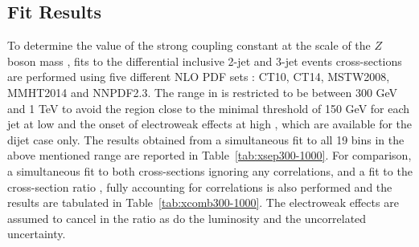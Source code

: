 \subsection{Fit Results}
To determine the value of the strong coupling constant at the scale of the $Z$ boson mass \alpsmz, fits to the differential inclusive 2-jet and 3-jet events cross-sections are performed using five different NLO PDF sets : CT10, CT14, MSTW2008, MMHT2014 and NNPDF2.3. The range in \httwo is restricted to be between 300 GeV and 1 TeV to avoid the region close to the minimal \pt threshold of 150 GeV for each jet at low \pt and the onset of electroweak effects at high \httwo, which are available for the dijet case only. The \alpsmz results obtained from a simultaneous fit to all 19 \httwo bins in the above mentioned range are reported in Table~\ref{tab:xsep300-1000}. For comparison, a simultaneous fit to both cross-sections ignoring any correlations, and a fit to the cross-section ratio \ratio, fully accounting for correlations is also performed and the results are tabulated in Table~\ref{tab:xcomb300-1000}. The electroweak effects are assumed to cancel in the ratio as do the luminosity and the uncorrelated uncertainty.

